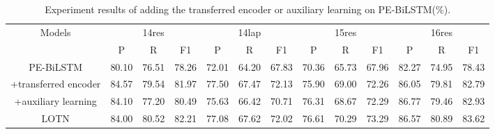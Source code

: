 \documentclass[letterpaper]{article} \usepackage{aaai20}  \usepackage{times}  \usepackage{helvet} \usepackage{courier}  \usepackage[hyphens]{url}  \usepackage{graphicx} \urlstyle{rm} \def\UrlFont{\rm}  \usepackage{graphicx}
\begin{document}
\begin{table*}[htbp]
	\caption{Experiment results of adding the transferred encoder or auxiliary learning on PE-BiLSTM(\%).} 
	\label{ablationstudy}
	\resizebox{0.98\textwidth}{!}
	{
		\begin{tabular}{c|c c c|c c c|c c c|c c c}
			\hline
			\multirow{2}{*}{Models} & \multicolumn{3}{c|}{14res} & \multicolumn{3}{c|}{14lap} & \multicolumn{3}{c|}{15res} & \multicolumn{3}{c}{16res}\\ 
			\cline{2-13}
			&P& R& F1 &P& R& F1&P& R& F1&P& R& F1 \\
			\hline
			PE-BiLSTM & 80.10 & 76.51 & 78.26 & 72.01&64.20& 67.83 & 70.36 & 65.73 & 67.96 & 82.27 & 74.95 & 78.43 \\
			\hline
			+transferred encoder & 84.57 & 79.54 & 81.97 & 77.50&67.47& 72.13 & 75.90 & 69.00 & 72.26 & 86.05 & 79.81 & 82.79 \\
			+auxiliary learning  & 84.10 & 77.20 & 80.49 & 75.63&66.42& 70.71 & 76.31 & 68.67 & 72.29 & 86.77 & 79.46 & 82.93 \\
			LOTN & 84.00& 80.52&  82.21 &  77.08& 67.62&  72.02 &  76.61 &  70.29 &  73.29 &  86.57 &  80.89 &  83.62 \\
			\hline
	\end{tabular} }
	\centering
\end{table*}
\end{document}
